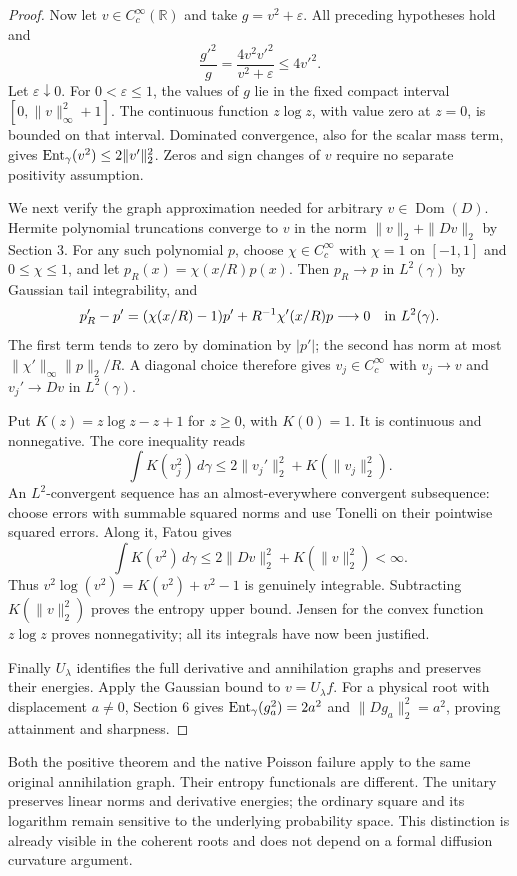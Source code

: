 \documentclass[11pt]{article}
\newcommand{\R}{\mathbb R}\newcommand{\N}{\mathbb N}
\newcommand{\Dom}{\operatorname{Dom}}
\begin{document}
\begin{proof}
Now let $v\in C_c^\infty(\R)$ and take $g=v^2+\varepsilon$.
All preceding hypotheses hold and
\[
 \frac{g'^2}{g}=\frac{4v^2v'^2}{v^2+\varepsilon}\leq4v'^2.
\]
Let $\varepsilon\downarrow0$. For $0<\varepsilon\leq1$, the values
of $g$ lie in the fixed compact interval $[0,\|v\|_\infty^2+1]$.
The continuous function $z\log z$, with value zero at $z=0$, is
bounded on that interval. Dominated convergence, also for the scalar
mass term, gives $\operatorname{Ent}_\gamma(v^2)\leq2\|v'\|_2^2$.
Zeros and sign changes of $v$ require no separate positivity assumption.

We next verify the graph approximation needed for arbitrary
$v\in\Dom(D)$. Hermite polynomial truncations converge to $v$ in
the norm $\|v\|_2+\|Dv\|_2$ by Section 3. For any such polynomial
$p$, choose $\chi\in C_c^\infty$ with $\chi=1$ on $[-1,1]$ and
$0\leq\chi\leq1$, and let $p_R(x)=\chi(x/R)p(x)$.
Then $p_R\to p$ in $L^2(\gamma)$ by Gaussian tail integrability, and
\[
 p_R'-p'=(\chi(x/R)-1)p'+R^{-1}\chi'(x/R)p\longrightarrow0
 \quad\hbox{in }L^2(\gamma).
\]
The first term tends to zero by domination by $|p'|$; the second has
norm at most $\|\chi'\|_\infty\|p\|_2/R$.
A diagonal choice therefore gives $v_j\in C_c^\infty$ with
$v_j\to v$ and $v_j'\to Dv$ in $L^2(\gamma)$.

Put $K(z)=z\log z-z+1$ for $z\geq0$, with $K(0)=1$.
It is continuous and nonnegative. The core inequality reads
\[
 \int K(v_j^2)\,d\gamma
 \leq2\|v_j'\|_2^2+K(\|v_j\|_2^2).
\]
An $L^2$-convergent sequence has an almost-everywhere convergent
subsequence: choose errors with summable squared norms and use
Tonelli on their pointwise squared errors. Along it, Fatou gives
\[
 \int K(v^2)\,d\gamma
 \leq2\|Dv\|_2^2+K(\|v\|_2^2)<\infty.
\]
Thus $v^2\log(v^2)=K(v^2)+v^2-1$ is genuinely integrable.
Subtracting $K(\|v\|_2^2)$ proves the entropy upper bound.
Jensen for the convex function $z\log z$ proves nonnegativity;
all its integrals have now been justified.

Finally $U_\lambda$ identifies the full derivative and annihilation
graphs and preserves their energies. Apply the Gaussian bound to
$v=U_\lambda f$. For a physical root with displacement $a\ne0$,
Section 6 gives $\operatorname{Ent}_\gamma(g_a^2)=2a^2$ and
$\|Dg_a\|_2^2=a^2$, proving attainment and sharpness.
\end{proof}

Both the positive theorem and the native Poisson failure apply to
the same original annihilation graph. Their entropy functionals are
different. The unitary preserves linear norms and derivative energies;
the ordinary square and its logarithm remain sensitive to the
underlying probability space. This distinction is already visible in
the coherent roots and does not depend on a formal diffusion
curvature argument.
\end{document}
